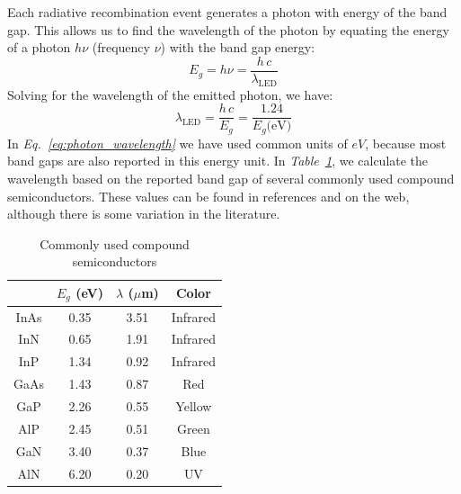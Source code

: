 Each radiative recombination event generates a photon with energy of the band gap.  This allows us to find the wavelength of the photon by equating the energy of a photon $h \nu$ (frequency $\nu$) with the band gap energy:
    \begin{equation} 
        E_g = h \nu = \frac{h\,c}{\lambda_{\text{LED}}} 
    \end{equation}
Solving for the wavelength of the emitted photon, we have:
    \begin{equation} 
        \lambda_{\text{LED}} = \frac{h\,c}{E_g} = \frac{1.24}{E_g \text{(eV)}}
        \label{eq:photon_wavelength}
    \end{equation}
In \emph{Eq.~\ref{eq:photon_wavelength}} we have used common units of $eV$, because most band gaps are also reported in this energy unit.  In \emph{Table~\ref{tab:rainbow}}, we calculate the wavelength based on the reported band gap of several commonly used compound semiconductors.  These values can be found in references and on the web, although there is some variation in the literature.
\begin{table}[H]
    \begin{center}
      \caption{Commonly used compound semiconductors}
        \begin{tabular}{cccc}
            \toprule
            & $E_g$ (eV) & $\lambda$ ($\mu$m) & \textbf{Color} \\
            \midrule
                \rowcolor[rgb]{.851, .851, .851}    InAs & 0.35 & 3.51 & Infrared\\
                                                    InN & 0.65 & 1.91 & Infrared\\
                \rowcolor[rgb]{.851, .851, .851}    InP & 1.34 & 0.92 & Infrared\\
                                                    GaAs & 1.43 & 0.87 & Red\\
                \rowcolor[rgb]{.851, .851, .851}    GaP & 2.26 & 0.55 & Yellow\\
                                                    AlP & 2.45 & 0.51 & Green\\
                \rowcolor[rgb]{.851, .851, .851}    GaN & 3.40 & 0.37 & Blue\\
                                                    AlN & 6.20 & 0.20 & UV\\
            \bottomrule
        \end{tabular}
        \label{tab:rainbow}
    \end{center}
\end{table}

